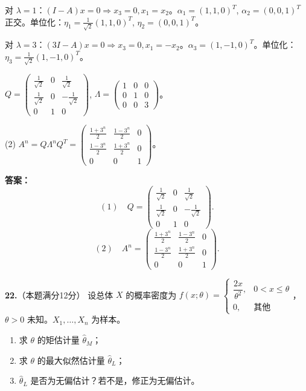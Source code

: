 对 $\lambda=1$：$(I-A)x=0 \Rightarrow x_3=0,x_1=x_2$。$\alpha_1=(1,1,0)^T$, $\alpha_2=(0,0,1)^T$ 正交。单位化：$\eta_1=\frac{1}{\sqrt{2}}(1,1,0)^T$, $\eta_2=(0,0,1)^T$。

对 $\lambda=3$：$(3I-A)x=0 \Rightarrow x_3=0,x_1=-x_2$。$\alpha_3=(1,-1,0)^T$。单位化：$\eta_3=\frac{1}{\sqrt{2}}(1,-1,0)^T$。

$Q = \begin{pmatrix} \frac{1}{\sqrt{2}} & 0 & \frac{1}{\sqrt{2}} \\ \frac{1}{\sqrt{2}} & 0 & -\frac{1}{\sqrt{2}} \\ 0 & 1 & 0 \end{pmatrix}$, $\Lambda = \begin{pmatrix}1&0&0\\0&1&0\\0&0&3\end{pmatrix}$。

(2) $A^n = Q\Lambda^n Q^T = \begin{pmatrix} \frac{1+3^n}{2} & \frac{1-3^n}{2} & 0 \\ \frac{1-3^n}{2} & \frac{1+3^n}{2} & 0 \\ 0 & 0 & 1 \end{pmatrix}$。
\par\noindent\textbf{答案：}
\[
(1)\quad Q=\begin{pmatrix} \frac{1}{\sqrt{2}} & 0 & \frac{1}{\sqrt{2}} \\ \frac{1}{\sqrt{2}} & 0 & -\frac{1}{\sqrt{2}} \\ 0 & 1 & 0 \end{pmatrix}.
\]
\[
(2)\quad A^n=\begin{pmatrix} \frac{1+3^n}{2} & \frac{1-3^n}{2} & 0 \\ \frac{1-3^n}{2} & \frac{1+3^n}{2} & 0 \\ 0 & 0 & 1 \end{pmatrix}.
\]
\else \answerarea[8] \fi

\vspace{8pt}

\textbf{22.}（本题满分12分）
设总体 $X$ 的概率密度为 $f(x;\theta)=\begin{cases}\dfrac{2x}{\theta^2}, & 0<x\leqslant\theta\\0,&\text{其他}\end{cases}$，$\theta>0$ 未知。$X_1,\ldots,X_n$ 为样本。
\begin{enumerate}
    \item[(1)] 求 $\theta$ 的矩估计量 $\hat{\theta}_M$；
    \item[(2)] 求 $\theta$ 的最大似然估计量 $\hat{\theta}_L$；
    \item[(3)] $\hat{\theta}_L$ 是否为无偏估计？若不是，修正为无偏估计。
\end{enumerate}

